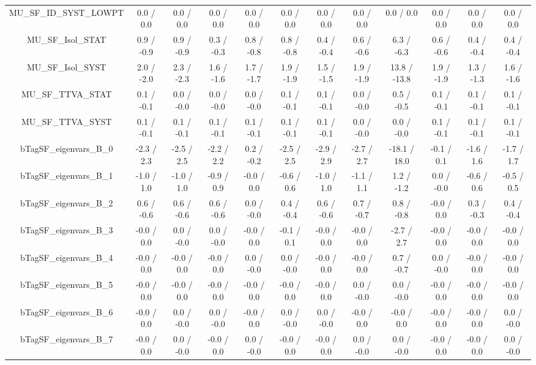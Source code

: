 \begin{table}[htbp]
\begin{center}
\begin{tabular}{|c|c|c|c|c|c|c|c|c|c|c|c|}
  MU_SF_ID_SYST_LOWPT & 0.0 / 0.0 & 0.0 / 0.0 & 0.0 / 0.0 & 0.0 / 0.0 & 0.0 / 0.0 & 0.0 / 0.0 & 0.0 / 0.0 & 0.0 / 0.0 & 0.0 / 0.0 & 0.0 / 0.0 & 0.0 / 0.0 \\ 
  MU_SF_Isol_STAT & 0.9 / -0.9 & 0.9 / -0.9 & 0.3 / -0.3 & 0.8 / -0.8 & 0.8 / -0.8 & 0.4 / -0.4 & 0.6 / -0.6 & 6.3 / -6.3 & 0.6 / -0.6 & 0.4 / -0.4 & 0.4 / -0.4 \\ 
  MU_SF_Isol_SYST & 2.0 / -2.0 & 2.3 / -2.3 & 1.6 / -1.6 & 1.7 / -1.7 & 1.9 / -1.9 & 1.5 / -1.5 & 1.9 / -1.9 & 13.8 / -13.8 & 1.9 / -1.9 & 1.3 / -1.3 & 1.6 / -1.6 \\ 
  MU_SF_TTVA_STAT & 0.1 / -0.1 & 0.0 / -0.0 & 0.0 / -0.0 & 0.0 / -0.0 & 0.1 / -0.1 & 0.1 / -0.1 & 0.0 / -0.0 & 0.5 / -0.5 & 0.1 / -0.1 & 0.1 / -0.1 & 0.1 / -0.1 \\ 
  MU_SF_TTVA_SYST & 0.1 / -0.1 & 0.1 / -0.1 & 0.1 / -0.1 & 0.1 / -0.1 & 0.1 / -0.1 & 0.1 / -0.1 & 0.0 / -0.0 & 0.0 / -0.0 & 0.1 / -0.1 & 0.1 / -0.1 & 0.1 / -0.1 \\ 
  bTagSF_eigenvars_B_0 & -2.3 / 2.3 & -2.5 / 2.5 & -2.2 / 2.2 & 0.2 / -0.2 & -2.5 / 2.5 & -2.9 / 2.9 & -2.7 / 2.7 & -18.1 / 18.0 & -0.1 / 0.1 & -1.6 / 1.6 & -1.7 / 1.7 \\ 
  bTagSF_eigenvars_B_1 & -1.0 / 1.0 & -1.0 / 1.0 & -0.9 / 0.9 & -0.0 / 0.0 & -0.6 / 0.6 & -1.0 / 1.0 & -1.1 / 1.1 & 1.2 / -1.2 & 0.0 / -0.0 & -0.6 / 0.6 & -0.5 / 0.5 \\ 
  bTagSF_eigenvars_B_2 & 0.6 / -0.6 & 0.6 / -0.6 & 0.6 / -0.6 & 0.0 / -0.0 & 0.4 / -0.4 & 0.6 / -0.6 & 0.7 / -0.7 & 0.8 / -0.8 & -0.0 / 0.0 & 0.3 / -0.3 & 0.4 / -0.4 \\ 
  bTagSF_eigenvars_B_3 & -0.0 / 0.0 & 0.0 / -0.0 & 0.0 / -0.0 & -0.0 / 0.0 & -0.1 / 0.1 & -0.0 / 0.0 & -0.0 / 0.0 & -2.7 / 2.7 & -0.0 / 0.0 & -0.0 / 0.0 & -0.0 / 0.0 \\ 
  bTagSF_eigenvars_B_4 & -0.0 / 0.0 & -0.0 / 0.0 & -0.0 / 0.0 & 0.0 / -0.0 & 0.0 / -0.0 & -0.0 / 0.0 & -0.0 / 0.0 & 0.7 / -0.7 & 0.0 / -0.0 & -0.0 / 0.0 & -0.0 / 0.0 \\ 
  bTagSF_eigenvars_B_5 & -0.0 / 0.0 & -0.0 / 0.0 & -0.0 / 0.0 & -0.0 / 0.0 & -0.0 / 0.0 & -0.0 / 0.0 & 0.0 / -0.0 & 0.0 / -0.0 & -0.0 / 0.0 & -0.0 / 0.0 & -0.0 / 0.0 \\ 
  bTagSF_eigenvars_B_6 & -0.0 / 0.0 & 0.0 / -0.0 & 0.0 / -0.0 & -0.0 / 0.0 & 0.0 / -0.0 & 0.0 / -0.0 & -0.0 / 0.0 & -0.0 / 0.0 & -0.0 / 0.0 & -0.0 / 0.0 & 0.0 / -0.0 \\ 
  bTagSF_eigenvars_B_7 & -0.0 / 0.0 & 0.0 / -0.0 & -0.0 / 0.0 & 0.0 / -0.0 & -0.0 / 0.0 & -0.0 / 0.0 & 0.0 / -0.0 & 0.0 / -0.0 & -0.0 / 0.0 & -0.0 / 0.0 & 0.0 / -0.0 \\ 

\end{tabular}
\end{center}
\end{table}
